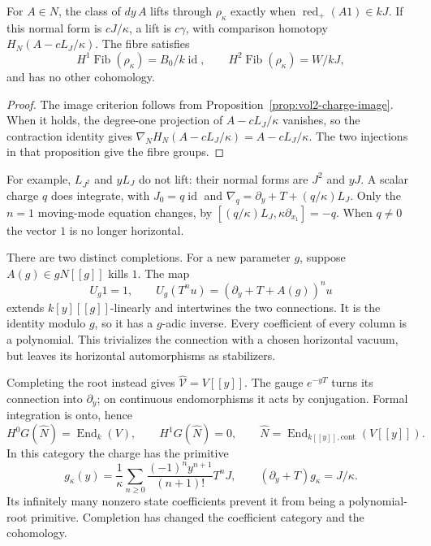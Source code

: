 \begin{corollary}\label{cor:vol2-charge-lift}
For $A\in N$, the class of $dy\,A$ lifts through
$\rho_\kappa$ exactly when $\operatorname{red}_+(A1)\in kJ$.
If this normal form is $cJ/\kappa$, a lift is $c\gamma$, with
comparison homotopy $H_N(A-cL_J/\kappa)$. The fibre satisfies
\[
 H^1\operatorname{Fib}(\rho_\kappa)=B_0/k\operatorname{id},
 \qquad H^2\operatorname{Fib}(\rho_\kappa)=W/kJ,
\]
and has no other cohomology.
\end{corollary}
\begin{proof}
The image criterion follows from Proposition~\ref{prop:vol2-charge-image}.
When it holds, the degree-one projection of $A-cL_J/\kappa$
vanishes, so the contraction identity gives
$\nabla_NH_N(A-cL_J/\kappa)=A-cL_J/\kappa$.
The two injections in that proposition give the fibre groups.
\end{proof}

For example, $L_{J^2}$ and $yL_J$ do not lift: their normal forms
are $J^2$ and $yJ$. A scalar charge $q$ does integrate, with
$J_0=q\operatorname{id}$ and
$\nabla_q=\partial_y+T+(q/\kappa)L_J$. Only the $n=1$ moving-mode
equation changes, by
$[(q/\kappa)L_J,\kappa\partial_{x_1}]=-q$.
When $q\ne0$ the vector $1$ is no longer horizontal.

There are two distinct completions. For a new parameter $g$,
suppose $A(g)\in gN[[g]]$ kills $1$. The map
\[
 U_g1=1,\qquad U_g(T^nu)=(\partial_y+T+A(g))^nu
\]
extends $k[y][[g]]$-linearly and intertwines the two connections.
It is the identity modulo $g$, so it has a $g$-adic inverse.
Every coefficient of every column is a polynomial. This trivializes
the connection with a chosen horizontal vacuum, but leaves its
horizontal automorphisms as stabilizers.

Completing the root instead gives $\widehat{\mathcal V}=V[[y]]$.
The gauge $e^{-yT}$ turns its connection into $\partial_y$; on
continuous endomorphisms it acts by conjugation. Formal integration
is onto, hence
\begin{equation}\label{eq:vol2-completed-root-operators}
 H^0G(\widehat N)=\operatorname{End}_k(V),\qquad
 H^1G(\widehat N)=0,
 \qquad
 \widehat N=\operatorname{End}_{k[[y]],\mathrm{cont}}(V[[y]]).
\end{equation}
In this category the charge has the primitive
\[
 g_\kappa(y)=\frac1\kappa\sum_{n\geq0}
          \frac{(-1)^ny^{n+1}}{(n+1)!}T^nJ,
 \qquad (\partial_y+T)g_\kappa=J/\kappa.
\]
Its infinitely many nonzero state coefficients prevent it from
being a polynomial-root primitive. Completion has changed the
coefficient category and the cohomology.

